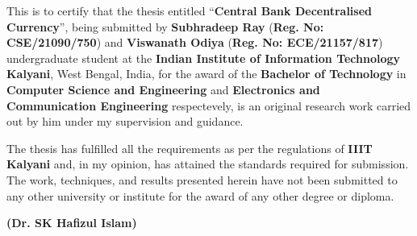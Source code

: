\vspace{0.5cm} This is to certify that the thesis entitled
``\textbf{Central Bank Decentralised Currency}'', being submitted by \textbf{Subhradeep Ray} (\textbf{Reg. No: CSE/21090/750}) and \textbf{Viswanath Odiya} (\textbf{Reg. No: ECE/21157/817}) undergraduate
student at the \textbf{Indian Institute of Information Technology
    Kalyani}, West Bengal, India, for the award of the \textbf{Bachelor
    of Technology} in
\textbf{Computer Science and Engineering} and \textbf{Electronics and Communication Engineering} respectevely, is an original research work carried
out by him under my supervision and guidance.

\noindent \par The thesis has fulfilled all the requirements as per
the regulations of \textbf{IIIT Kalyani} and, in my opinion, has
attained the standards required for submission. The work,
techniques, and results presented herein have not been submitted to
any other university or institute for the award of any other degree
or diploma.

\vspace{1in}

\begin{flushright}
    \textbf{(Dr. SK Hafizul Islam)}\\
    \\
    \\
    \\
\end{flushright}
